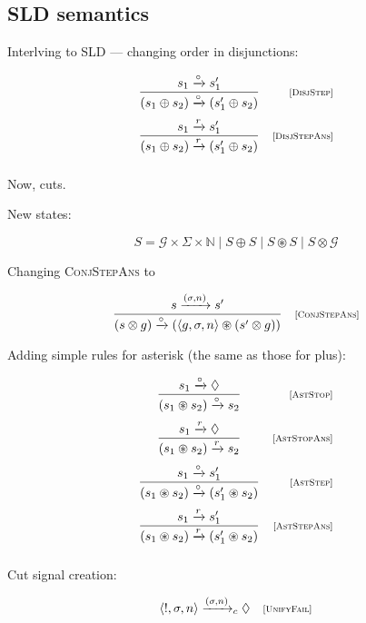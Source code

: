 \subsection{SLD semantics}


Interlving to SLD --- changing order in disjunctions:

\[
  \begin{array}{cr}
    \dfrac{s_1 \xrightarrow{\circ} s'_1}{(s_1 \oplus s_2) \xrightarrow{\circ} (s'_1 \oplus s_2)} &\mbox{\scriptsize{[\textsc{DisjStep}]}}\\[5mm]
    \dfrac{s_1 \xrightarrow{r} s'_1}{(s_1 \oplus s_2) \xrightarrow{r} (s'_1 \oplus s_2)} &\mbox{\scriptsize{[\textsc{DisjStepAns}]}}\\[5mm]
  \end{array}
\]

Now, cuts.

New states:

\[
S = \mathcal{G}\times\Sigma\times\mathbb{N}\mid S\oplus S \mid  S \circledast S \mid S \otimes \mathcal{G}
\]


Changing \textsc{ConjStepAns} to

  \[
  \begin{array}{cr}
    \dfrac{s \xrightarrow{(\sigma, n)} s'}{(s \otimes g) \xrightarrow{\circ} (\left<{g, \sigma, n}\right> \circledast (s' \otimes g))} & \mbox{\scriptsize{[\textsc{ConjStepAns}]}} 
  \end{array}
  \]
  
Adding simple rules for asterisk (the same as those for plus):

  \[
  \begin{array}{cr}
    \dfrac{s_1 \xrightarrow{\circ} \Diamond}{(s_1 \circledast s_2) \xrightarrow{\circ} s_2} & \mbox{\scriptsize{[\textsc{AstStop}]}}\\[5mm]
    \dfrac{s_1 \xrightarrow{r} \Diamond}{(s_1 \circledast s_2) \xrightarrow{r} s_2} & \mbox{\scriptsize{[\textsc{AstStopAns}]}}\\[5mm]
    \dfrac{s_1 \xrightarrow{\circ} s'_1}{(s_1 \circledast s_2) \xrightarrow{\circ} (s'_1 \circledast s_2)} &\mbox{\scriptsize{[\textsc{AstStep}]}}\\[5mm]
    \dfrac{s_1 \xrightarrow{r} s'_1}{(s_1 \circledast s_2) \xrightarrow{r} (s'_1 \circledast s_2)} &\mbox{\scriptsize{[\textsc{AstStepAns}]}}\\[5mm]
  \end{array}
\]
  
Cut signal creation:

  \[
  \begin{array}{cr}
    \left<{!, \sigma, n}\right> \xrightarrow{(\sigma, n)}_c \Diamond &\mbox{\scriptsize{[\textsc{UnifyFail}]}} \\[2mm]
  \end{array}
\]

